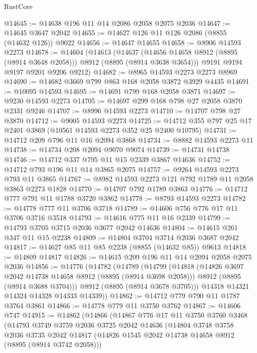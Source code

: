 \begin{lexlean}{RustCore}
\begin{coremodule}
@14645 := @14638 @196 @11 @14 @2086 @2058 @2075 @2036
@14647 := @14645 @3647 @2042
@14655 := @14627 @126 @11 @126 @2086 (@8855 (@14632 @126)) @9022
@14656 := @14647 @14655
@14658 := @8906 @14593 @2273
@14678 := @14604
    (@14613
      (@14637 (@14656 @14658 @8912 (@8895 (@8914 @3648 @2058))) @8912 (@8895 (@8914 @3638 @3654)))
      @9191
      @9194
      @9197
      @9201
      @9206
      @9212)
@14682 := @8965 @14593 @2273 @2273 @8969
@14690 := @14682 @3669 @799 @863 @168 @2058 @3872 @3929 @4435
@14691 := @10095 @14593
@14695 := @14691 @799 @168 @2058 @3871
@14697 := @9230 @14593 @2273
@14705 := @14697 @299 @168 @798 @27 @2058 @3870 @2331 @9246
@14707 := @8996 @14593 @2273
@14710 := @14707 @798 @27 @3870
@14712 := @9005 @14593 @2273
@14725 := @14712 @355 @797 @25 @17 @2401 @3869 (@10561 @14593 @2273 @352 @25 @2400 @10795)
@14731 := @14712 @209 @796 @11 @16 @2094 @3868
@14734 := @8882 @14593 @2273 @11
@14738 := @14734 @208 @2094 @9070 @9074
@14739 := @14731 @14738
@14746 := @14712 @337 @795 @11 @15 @2339 @3867 @14636
@14752 := @14712 @793 @196 @11 @14 @3865 @2075
@14757 := @9264 @14593 @2273 @793 @11 @3865
@14767 := @8982 @14593 @2273 @121 @792 @1789 @11 @2058 @3863 @2273 @1828
@14770 := @14707 @792 @1789 @3863
@14776 := @14712 @777 @791 @11 @1788 @3720 @3862
@14778 := @8793 @14593 @2273
@14782 := @14778 @777 @11 @3706 @3718
@14789 := @14606 @756 @776 @17 @11 @3706 @3716 @3518
@14793 := @14616 @775 @11 @16 @2339
@14799 := @14793 @3705 @3715 @2036 @3677 @2042 @14636
@14804 := @14615 @261 @347 @11 @15 @2238
@14809 := @14804 @3704 @3714 @2036 @3687 @2042
@14817 := @14627 @85 @11 @85 @2238 (@8855 (@14632 @85)) @9613
@14818 := @14809 @14817
@14826 := @14615 @209 @196 @11 @14 @2094 @2058 @2075 @2036
@14856 := @14776
    (@14782
      (@14789
        (@14799
          (@14818
            (@14826 @3697 @2042 @14738 @14658 @8912 (@8895 (@8914 @3698 @2058)))
            @8912
            (@8895 (@8914 @3688 @3704)))
          @8912
          (@8895 (@8914 @3678 @3705)))
        @14318
        @14321
        @14324
        @14328
        @14333
        @14339))
@14862 := @14712 @779 @790 @11 @1787 @3764 @3861
@14866 := @14778 @779 @11 @3750 @3762
@14867 := @14606 @747
@14915 := @14862
    (@14866
      (@14867
        @776
        @17
        @11
        @3750
        @3760
        @3468
        (@14793
          @3749
          @3759
          @2036
          @3725
          @2042
          @14636
          (@14804
            @3748
            @3758
            @2036
            @3735
            @2042
            @14817
            (@14826 @1545 @2042 @14738 @14658 @8912 (@8895 (@8914 @3742 @2058)))

\end{coremodule}
\end{lexlean}
